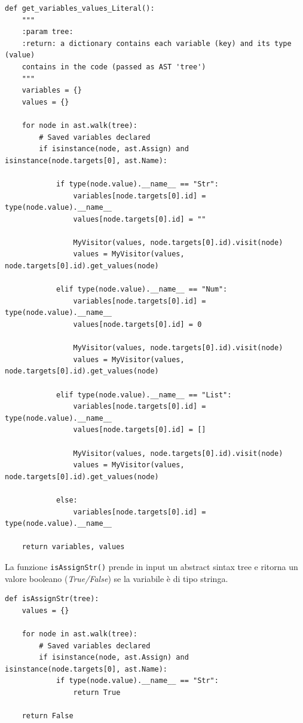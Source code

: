 \documentclass[a4paper,oneside,openright,titlepage,10pt,footinclude,headinclude]{scrbook}
\begin{document}
\begin{graybox}[innerleftmargin=2,]
\begin{lstlisting}
def get_variables_values_Literal():
    """
    :param tree:
    :return: a dictionary contains each variable (key) and its type (value) 
    contains in the code (passed as AST 'tree')
    """
    variables = {}
    values = {}

    for node in ast.walk(tree):
        # Saved variables declared
        if isinstance(node, ast.Assign) and isinstance(node.targets[0], ast.Name):

            if type(node.value).__name__ == "Str":
                variables[node.targets[0].id] = type(node.value).__name__
                values[node.targets[0].id] = ""
                
                MyVisitor(values, node.targets[0].id).visit(node)
                values = MyVisitor(values, node.targets[0].id).get_values(node)

            elif type(node.value).__name__ == "Num":
                variables[node.targets[0].id] = type(node.value).__name__
                values[node.targets[0].id] = 0
                
                MyVisitor(values, node.targets[0].id).visit(node)
                values = MyVisitor(values, node.targets[0].id).get_values(node)

            elif type(node.value).__name__ == "List":
                variables[node.targets[0].id] = type(node.value).__name__
                values[node.targets[0].id] = []
                
                MyVisitor(values, node.targets[0].id).visit(node)
                values = MyVisitor(values, node.targets[0].id).get_values(node)

            else:
                variables[node.targets[0].id] = type(node.value).__name__

    return variables, values
\end{lstlisting}
\end{graybox}


La funzione \texttt{isAssignStr()} prende in input un abstract sintax tree e ritorna un valore booleano (\textit{True/False}) se la variabile è di tipo stringa.
\begin{graybox}[innerleftmargin=2,]
\begin{lstlisting}
def isAssignStr(tree):
    values = {}

    for node in ast.walk(tree):
        # Saved variables declared
        if isinstance(node, ast.Assign) and isinstance(node.targets[0], ast.Name):
            if type(node.value).__name__ == "Str":
                return True

    return False
\end{lstlisting}
\end{graybox}
\end{document}
